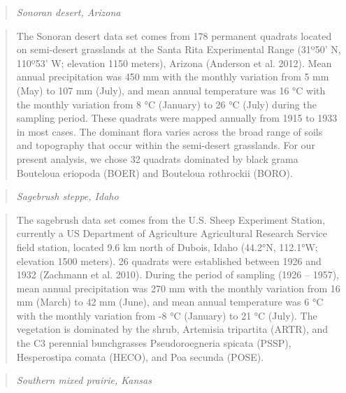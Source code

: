 \documentclass[12pt,]{article}
\begin{document}
\begin{quote}
\emph{Sonoran desert, Arizona}
\end{quote}

\begin{quote}
The Sonoran desert data set comes from 178 permanent quadrats located on
semi-desert grasslands at the Santa Rita Experimental Range (31º50' N,
110º53' W; elevation 1150 meters), Arizona (Anderson et al. 2012). Mean
annual precipitation was 450 mm with the monthly variation from 5 mm
(May) to 107 mm (July), and mean annual temperature was 16 °C with the
monthly variation from 8 °C (January) to 26 °C (July) during the
sampling period. These quadrats were mapped annually from 1915 to 1933
in most cases. The dominant flora varies across the broad range of soils
and topography that occur within the semi-desert grasslands. For our
present analysis, we chose 32 quadrats dominated by black grama
Bouteloua eriopoda (BOER) and Bouteloua rothrockii (BORO).
\end{quote}

\begin{quote}
\emph{Sagebrush steppe, Idaho}
\end{quote}

\begin{quote}
The sagebrush data set comes from the U.S. Sheep Experiment Station,
currently a US Department of Agriculture Agricultural Research Service
field station, located 9.6 km north of Dubois, Idaho (44.2°N, 112.1°W;
elevation 1500 meters). 26 quadrats were established between 1926 and
1932 (Zachmann et al. 2010). During the period of sampling (1926 --
1957), mean annual precipitation was 270 mm with the monthly variation
from 16 mm (March) to 42 mm (June), and mean annual temperature was 6 °C
with the monthly variation from -8 °C (January) to 21 °C (July). The
vegetation is dominated by the shrub, Artemisia tripartita (ARTR), and
the C3 perennial bunchgrasses Pseudoroegneria spicata (PSSP),
Hesperostipa comata (HECO), and Poa secunda (POSE).
\end{quote}

\begin{quote}
\emph{Southern mixed prairie, Kansas}
\end{quote}
\end{document}
